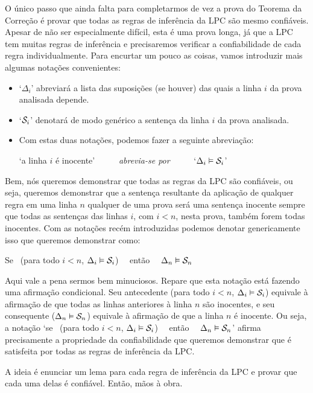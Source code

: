O único passo que ainda falta para completarmos de vez a prova do Teorema da Correção é provar que todas as regras de inferência da LPC são mesmo confiáveis.
Apesar de não ser especialmente difícil, esta é uma prova longa, já que a LPC tem muitas regras de inferência e precisaremos verificar a confiabilidade de cada regra individualmente.
Para encurtar um pouco as coisas, vamos introduzir mais algumas notações convenientes:
\begin{itemize}
	\item `$\Delta_i$' abreviará a lista das suposições (se houver) das quais a linha $i$ da prova analisada depende.
	\item `$\mathcal{S}_i$' denotará de modo genérico a sentença da linha $i$ da prova analisada.
	\item Com estas duas notações, podemos fazer a seguinte abreviação:
		\begin{center}
			`a linha $i$ é inocente' \ \ \ \ \ \textit{abrevia-se por} \ \ \ \ \ `$\Delta_i \vDash \mathcal{S}_i$'
		\end{center}
\end{itemize}

Bem, nós queremos demonstrar que todas as regras da LPC são confiáveis, ou seja, queremos demonstrar que a sentença resultante da aplicação de qualquer regra em uma linha $n$ qualquer de uma prova será uma sentença inocente sempre que todas as sentenças das linhas $i$, com $i<n$, nesta prova, também forem todas inocentes.
Com as notações recém introduzidas podemos denotar genericamente isso que queremos demonstrar como:
\begin{center}
	Se  \ ({para todo}  $i<n$, $\Delta_i \vDash \mathcal{S}_i$) \ \ então \ \ $\Delta_n \vDash \mathcal{S}_n$
\end{center}

Aqui vale a pena sermos bem minuciosos.
Repare que esta notação está fazendo uma afirmação condicional.
Seu antecedente (para todo  $i<n$, $\Delta_i \vDash \mathcal{S}_i$) equivale à afirmação de que todas as linhas anteriores à linha $n$ são inocentes, e seu consequente ($\Delta_n \vDash \mathcal{S}_n$) equivale à afirmação de que a linha $n$ é inocente.
Ou seja, a notação  `se  \ ({para todo}  $i<n$, $\Delta_i \vDash \mathcal{S}_i$) \ \ então \ \ $\Delta_n \vDash \mathcal{S}_n$' afirma precisamente a propriedade da confiabilidade que queremos demonstrar que é satisfeita por todas as regras de inferência da LPC.

A ideia é enunciar um lema para cada regra de inferência da LPC e provar que cada uma delas é confiável.
Então, mãos à obra.

